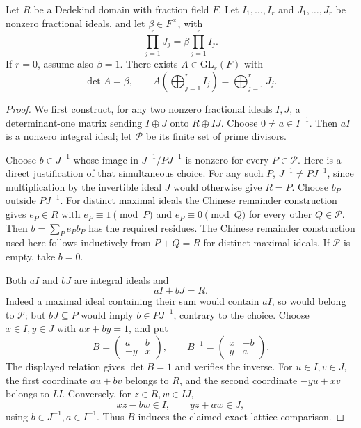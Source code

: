 \begin{srproposition}\label{prop:sr-ideal-lattices}
Let \(R\) be a Dedekind domain with fraction field \(F\).
Let \(I_1,\ldots,I_r\) and \(J_1,\ldots,J_r\) be nonzero
fractional ideals, and let \(\beta\in F^\times\), with
\[
                  \prod_{j=1}^rJ_j=\beta\prod_{j=1}^rI_j.
\]
If \(r=0\), assume also \(\beta=1\).
There exists \(A\in\mathrm{GL}_r(F)\) with
\[
 \det A=\beta,\qquad
             A\left(\bigoplus_{j=1}^rI_j\right)
                         =\bigoplus_{j=1}^rJ_j.
\]
\end{srproposition}
\begin{proof}
We first construct, for any two nonzero fractional ideals \(I,J\),
a determinant-one matrix sending \(I\oplus J\) onto \(R\oplus IJ\).
Choose \(0\ne a\in I^{-1}\).
Then \(aI\) is a nonzero integral ideal; let \(\mathcal P\) be its
finite set of prime divisors.

Choose \(b\in J^{-1}\) whose image in \(J^{-1}/PJ^{-1}\) is nonzero
for every \(P\in\mathcal P\).
Here is a direct justification of that simultaneous choice.
For any such \(P\), \(J^{-1}\ne PJ^{-1}\), since multiplication
by the invertible ideal \(J\) would otherwise give \(R=P\).
Choose \(b_P\) outside \(PJ^{-1}\).
For distinct maximal ideals the Chinese remainder construction gives
\(e_P\in R\) with
\(e_P\equiv1\pmod P\) and \(e_P\equiv0\pmod Q\) for every other
\(Q\in\mathcal P\).
Then \(b=\sum_P e_Pb_P\) has the required residues.
The Chinese remainder construction used here follows inductively
from \(P+Q=R\) for distinct maximal ideals.
If \(\mathcal P\) is empty, take \(b=0\).

Both \(aI\) and \(bJ\) are integral ideals and
\[
                         aI+bJ=R.
\]
Indeed a maximal ideal containing their sum would contain \(aI\),
so would belong to \(\mathcal P\); but \(bJ\subseteq P\) would
imply \(b\in PJ^{-1}\), contrary to the choice.
Choose \(x\in I,y\in J\) with \(ax+by=1\), and put
\[
       B=\begin{pmatrix}a&b\\-y&x\end{pmatrix},
       \qquad
       B^{-1}=\begin{pmatrix}x&-b\\y&a\end{pmatrix}.
\]
The displayed relation gives \(\det B=1\) and verifies the inverse.
For \(u\in I,v\in J\), the first coordinate \(au+bv\) belongs
to \(R\), and the second coordinate \(-yu+xv\) belongs to \(IJ\).
Conversely, for \(z\in R,w\in IJ\),
\[
                 xz-bw\in I,\qquad yz+aw\in J,
\]
using \(b\in J^{-1},a\in I^{-1}\).
Thus \(B\) induces the claimed exact lattice comparison.


\end{proof}
